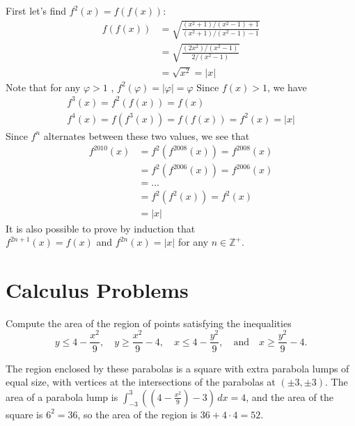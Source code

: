 \documentclass[12pt]{article}
\newcounter{problem}
\begin{document}
\begin{solution}[B]
      First let's find $f^2(x) = f(f(x))$:
      \begin{align*}
         f(f(x)) &= \sqrt{ \frac{ (x^2+1)/(x^2-1)+1 } { (x^2+1)/(x^2-1) -1} } \\
         &= \sqrt{ \frac{ (2x^2)/(x^2-1) }{ 2/(x^2-1) } } \\
         &= \sqrt{x^2} = |x|
      \end{align*}
      Note that for any $\varphi>1$ ,  $f^2(\varphi) = |\varphi| = \varphi$
      Since $f(x)>1$, we have \\
      \begin{align*}
         f^3(x)=f^2(f(x)) = f(x) \\
         f^4(x) = f(f^3(x)) = f(f(x)) = f^2(x) = |x|
      \end{align*}
      Since $f^n$ alternates between these two values, we see that
      \begin{align*}
         f^{2010}(x) &= f^2(f^{2008}(x)) = f^{2008}(x)\\
         &= f^2(f^{2006}(x)) = f^{2006}(x) \\
         &= \ldots \\
         &= f^2(f^2(x)) = f^2(x) \\
         &= \boxed{|x|}
      \end{align*}
      It is also possible to prove by induction that \\
      $f^{2n+1}(x) = f(x)$ and $f^{2n}(x)=|x|$ for any $n \in \mathbb{Z}^{+}$.
\end{solution}

\newpage

\section*{Calculus Problems}

\begin{problem}[R][4][BMT 2021/4]
   Compute the area of the region of points satisfying the inequalities 
\[ y \leq 4 - \frac{x^2}{9}, \quad y \geq \frac{x^2}{9} - 4, \quad x \leq 4 - \frac{y^2}{9}, \quad \text{and} \quad x \geq \frac{y^2}{9} - 4. \]
\end{problem}

\vspace{-1.5cm}

\begin{solution}[52]
   The region enclosed by these parabolas is a square with extra parabola lumps of equal size, with vertices at the intersections of the parabolas at \((\pm 3, \pm 3)\). The area of a parabola lump is \(\int_{-3}^{3} \left( \left(4 - \frac{x^2}{9}\right) - 3 \right) \, dx = 4\), and the area of the square is \(6^2 = 36\), so the area of the region is $36 + 4 \cdot 4 = \boxed{52}$.
\end{solution}
\end{document}
